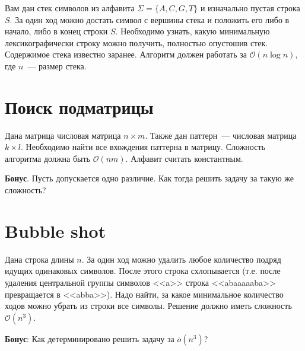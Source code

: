 \documentclass[addpoints]{exam}
\begin{document}
Вам дан стек символов из алфавита $\Sigma = \{A,C,G,T\}$ и изначально пустая строка $S$. За один ход можно достать символ с вершины стека и положить его либо в начало, либо в конец строки $S$. Необходимо узнать, какую минимальную лексикографически строку можно получить, полностью опустошив стек. Содержимое стека известно заранее. Алгоритм должен работать за $\mathcal{O}(n \log{n})$, где $n$~--- размер стека.

\section{Поиск подматрицы}

Дана матрица числовая матрица $n \times m$. Также дан паттерн~--- числовая матрица $k \times l$. Необходимо найти все вхождения паттерна в матрицу. Сложность алгоритма должна быть $\mathcal{O}(nm)$. Алфавит считать константным.

\textbf{Бонус}. Пусть допускается одно различие. Как тогда решить задачу за такую же сложность?

\section{Bubble shot}

Дана строка длины $n$. За один ход можно удалить любое количество подряд идущих одинаковых символов. После этого строка схлопывается (т.е. после удаления центральной группы символов <<a>> строка <<abaaaaaba>> превращается в <<abba>>). Надо найти, за какое минимальное количество ходов можно убрать из строки все символы. Решение должно иметь сложность $\mathcal{O}(n^3)$.

\textbf{Бонус}: Как детерминировано решить задачу за $\overline{o}(n^3)$?
\end{document}
